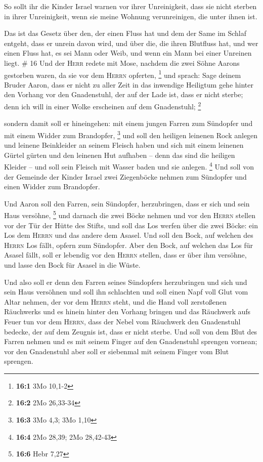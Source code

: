  So sollt ihr die Kinder Israel warnen vor ihrer
Unreinigkeit, dass sie nicht sterben in ihrer Unreinigkeit, wenn sie
meine Wohnung verunreinigen, die unter ihnen ist.

 Das ist das Gesetz über den, der einen Fluss hat und dem
der Same im Schlaf entgeht, dass er unrein davon wird, 
und über die, die ihren Blutfluss hat, und wer einen Fluss hat, es sei
Mann oder Weib, und wenn ein Mann bei einer Unreinen liegt. \# 16
 Und der \textsc{Herr} redete mit Mose, nachdem die zwei
Söhne Aarons gestorben waren, da sie vor dem \textsc{Herrn} opferten,
\footnote{\textbf{16:1} 3Mo 10,1-2}  und sprach: Sage
deinem Bruder Aaron, dass er nicht zu aller Zeit in das inwendige
Heiligtum gehe hinter den Vorhang vor den Gnadenstuhl, der auf der Lade
ist, dass er nicht sterbe; denn ich will in einer Wolke erscheinen auf
dem Gnadenstuhl; \footnote{\textbf{16:2} 2Mo 26,33-34}

 sondern damit soll er hineingehen: mit einem jungen
Farren zum Sündopfer und mit einem Widder zum Brandopfer, \footnote{\textbf{16:3}
  3Mo 4,3; 3Mo 1,10}  und soll den heiligen leinenen Rock
anlegen und leinene Beinkleider an seinem Fleisch haben und sich mit
einem leinenen Gürtel gürten und den leinenen Hut aufhaben -- denn das
sind die heiligen Kleider -- und soll sein Fleisch mit Wasser baden und
sie anlegen. \footnote{\textbf{16:4} 2Mo 28,39; 2Mo 28,42-43}
 Und soll von der Gemeinde der Kinder Israel zwei
Ziegenböcke nehmen zum Sündopfer und einen Widder zum Brandopfer.

 Und Aaron soll den Farren, sein Sündopfer, herzubringen,
dass er sich und sein Haus versöhne, \footnote{\textbf{16:6} Hebr 7,27}
 und darnach die zwei Böcke nehmen und vor den
\textsc{Herrn} stellen vor der Tür der Hütte des Stifts, 
und soll das Los werfen über die zwei Böcke: ein Los dem \textsc{Herrn}
und das andere dem Asasel.  Und soll den Bock, auf welchen
des \textsc{Herrn} Los fällt, opfern zum Sündopfer.  Aber
den Bock, auf welchen das Los für Asasel fällt, soll er lebendig vor den
\textsc{Herrn} stellen, dass er über ihm versöhne, und lasse den Bock
für Asasel in die Wüste.

 Und also soll er denn den Farren seines Sündopfers
herzubringen und sich und sein Haus versöhnen und soll ihn schlachten
 und soll einen Napf voll Glut vom Altar nehmen, der vor
dem \textsc{Herrn} steht, und die Hand voll zerstoßenen Räuchwerks und
es hinein hinter den Vorhang bringen  und das Räuchwerk
aufs Feuer tun vor dem \textsc{Herrn}, dass der Nebel vom Räuchwerk den
Gnadenstuhl bedecke, der auf dem Zeugnis ist, dass er nicht sterbe.
 Und soll von dem Blut des Farren nehmen und es mit
seinem Finger auf den Gnadenstuhl sprengen vornean; vor den Gnadenstuhl
aber soll er siebenmal mit seinem Finger vom Blut sprengen.

